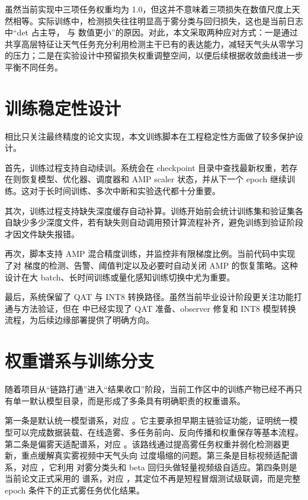 虽然当前实现中三项任务权重均为 1.0，但这并不意味着三项损失在数值尺度上天然相等。实际训练中，检测损失往往明显高于雾分类与回归损失，这也是当前日志中“det 占主导， 与  数值更小”的原因。对此，本文采取两种应对方式：一是通过共享高层特征让天气任务充分利用检测主干已有的表达能力，减轻天气头从零学习的压力；二是在实验设计中预留损失权重调整空间，以便后续根据收敛曲线进一步平衡不同任务。

\section{训练稳定性设计}

相比只关注最终精度的论文实现，本文训练脚本在工程稳定性方面做了较多保护设计。

首先，训练过程支持自动续训。系统会在 checkpoint 目录中查找最新权重，若存在则恢复模型、优化器、调度器和 AMP scaler 状态，并从下一个 epoch 继续训练。这对于长时间训练、多次中断和实验迭代都十分重要。

其次，训练过程支持缺失深度缓存自动补算。训练开始前会统计训练集和验证集各自缺少多少深度文件，若有缺失则自动调用预计算流程补齐，避免训练到验证阶段才因文件缺失报错。

再次，脚本支持 AMP 混合精度训练，并监控非有限梯度比例。当前代码中实现了对  梯度的检测、告警、阈值判定以及必要时自动关闭 AMP 的恢复策略。这种设计在大 batch、长时间训练或量化感知训练切换中尤为重要。

最后，系统保留了 QAT 与 INT8 转换路径。虽然当前毕业设计阶段更关注功能打通与方法验证，但在  中已经实现了 QAT 准备、observer 修复和 INT8 模型转换流程，为后续边缘部署提供了明确方向。

\section{权重谱系与训练分支}

随着项目从“链路打通”进入“结果收口”阶段，当前工作区中的训练产物已经不再只有单一默认模型目录，而是形成了多条具有明确职责的权重谱系。

第一条是默认统一模型谱系，对应 。它主要承担早期主链验证功能，证明统一模型可以完成数据装载、在线造雾、多任务前向、反向传播和权重保存等基本流程。第二条是偏雾天适配谱系，对应 。该路线通过提高雾任务权重并弱化检测器更新，重点缓解真实雾视频中天气头向  过度塌缩的问题。第三条是目标视频适配谱系，对应 ，它利用  对雾分类头和 beta 回归头做轻量视频级自适应。第四条则是当前论文正式采用的  谱系，对应 ，其定位不再是短程冒烟测试级联调，而是完整 epoch 条件下的正式雾任务优化结果。

